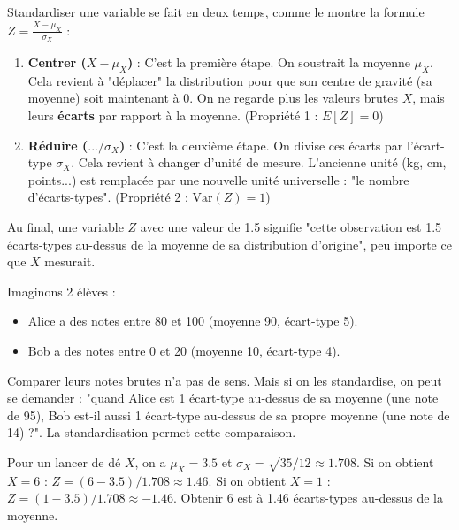 \begin{intuitionbox}
Standardiser une variable se fait en deux temps, comme le montre la formule $Z = \frac{X - \mu_X}{\sigma_X}$ :
\begin{enumerate}
    \item \textbf{Centrer ($X - \mu_X$)} : C'est la première étape. On soustrait la moyenne $\mu_X$. Cela revient à "déplacer" la distribution pour que son centre de gravité (sa moyenne) soit maintenant à 0. On ne regarde plus les valeurs brutes $X$, mais leurs \textbf{écarts} par rapport à la moyenne. (Propriété 1 : $E[Z]=0$)
    \item \textbf{Réduire ($... / \sigma_X$)} : C'est la deuxième étape. On divise ces écarts par l'écart-type $\sigma_X$. Cela revient à changer d'unité de mesure. L'ancienne unité (kg, cm, points...) est remplacée par une nouvelle unité universelle : "le nombre d'écarts-types". (Propriété 2 : $\text{Var}(Z)=1$)
\end{enumerate}
Au final, une variable $Z$ avec une valeur de 1.5 signifie "cette observation est 1.5 écarts-types au-dessus de la moyenne de sa distribution d'origine", peu importe ce que $X$ mesurait.
\end{intuitionbox}

\begin{intuitionbox}
Imaginons 2 élèves :
\begin{itemize}
    \item Alice a des notes entre 80 et 100 (moyenne 90, écart-type 5).
    \item Bob a des notes entre 0 et 20 (moyenne 10, écart-type 4).
\end{itemize}
Comparer leurs notes brutes n'a pas de sens. Mais si on les standardise, on peut se demander : "quand Alice est 1 écart-type au-dessus de sa moyenne (une note de 95), Bob est-il aussi 1 écart-type au-dessus de sa propre moyenne (une note de 14) ?". La standardisation permet cette comparaison.
\end{intuitionbox}

\begin{examplebox}
Pour un lancer de dé $X$, on a $\mu_X = 3.5$ et $\sigma_X = \sqrt{35/12} \approx 1.708$.
Si on obtient $X=6$ : $Z = (6 - 3.5) / 1.708 \approx 1.46$.
Si on obtient $X=1$ : $Z = (1 - 3.5) / 1.708 \approx -1.46$.
Obtenir 6 est à 1.46 écarts-types au-dessus de la moyenne.
\end{examplebox}

